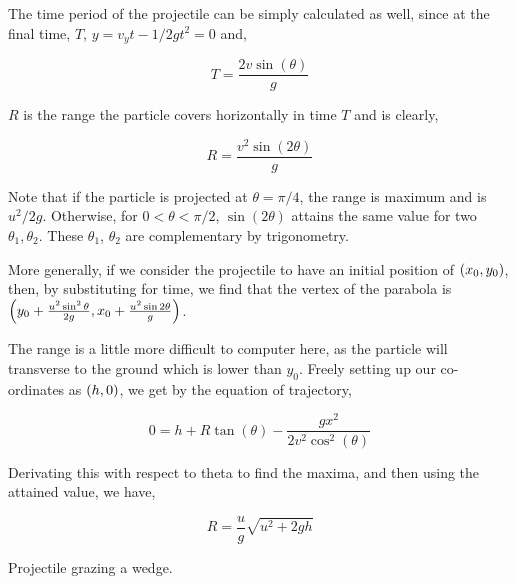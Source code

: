 The time period of the projectile can be simply calculated as well,
since at the final time, \(T\), \(y = v_yt - 1/2gt^2 = 0\) and,

\begin{equation}
    T = \frac{2v\sin(\theta)}{g}
\end{equation}

\(R\) is the range the particle covers horizontally in time \(T\) and is
clearly,

\begin{equation}
    R = \frac{v^2\sin(2\theta)}{g}
\end{equation}

Note that if the particle is projected at \(\theta = \pi/4\), 
the range is maximum and is \(u^2/2g\). Otherwise,
for \(0 < \theta < \pi/2\), \(\sin(2\theta)\) attains the same 
value for two \(\theta_1, \theta_2\). These \(\theta_1\), \(\theta_2\) are complementary
by trigonometry.

More generally, if we consider the projectile to have an initial position of 
\(\qty(x_0, y_0)\), then, by substituting for time, we find that the 
vertex of the parabola is \(\qty(y_0 + \frac{u^2\sin^2\theta}{2g}, x_0 + \frac{u^2\sin2\theta}{g})\).

The range is a little more difficult to computer here, as the particle will transverse to 
the ground which is lower than \(y_0\). Freely setting up our co-ordinates 
as \(\qty(h, 0)\), we get by the equation of trajectory,

\[
    0 = h + R\tan(\theta) - \frac{gx^2}{2v^2\cos^2(\theta)}
\]

Derivating this with respect to theta to find the maxima, and then using the attained
value, we have, 

\begin{equation}
    R = \frac{u}{g}\sqrt{u^2 + 2gh}
\end{equation}

\begin{marginfigure}
    \caption{Projectile grazing a wedge.}
\end{marginfigure}

